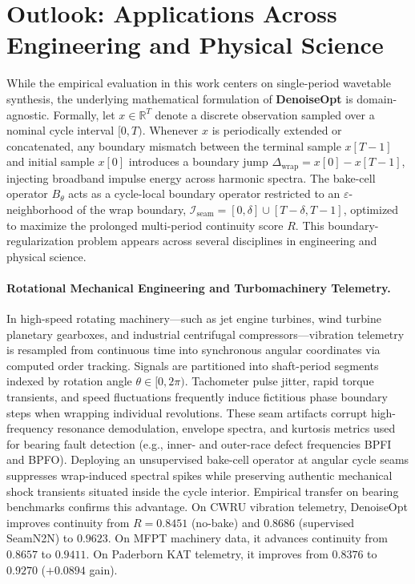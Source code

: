 \section{Outlook: Applications Across Engineering and Physical Science}
\label{sec:outlook}
\enlargethispage{30pt}

While the empirical evaluation in this work centers on single-period wavetable synthesis, the underlying mathematical formulation of \textbf{DenoiseOpt} is domain-agnostic.
Formally, let $x \in \mathbb{R}^T$ denote a discrete observation sampled over a nominal cycle interval $[0, T)$.
Whenever $x$ is periodically extended or concatenated, any boundary mismatch between the terminal sample $x[T-1]$ and initial sample $x[0]$ introduces a boundary jump $\Delta_{\text{wrap}} = x[0] - x[T-1]$, injecting broadband impulse energy across harmonic spectra.
The bake-cell operator $B_\theta$ acts as a cycle-local boundary operator restricted to an $\varepsilon$-neighborhood of the wrap boundary, $\mathcal{I}_{\text{seam}} = [0, \delta] \cup [T-\delta, T-1]$, optimized to maximize the prolonged multi-period continuity score $R$.
This boundary-regularization problem appears across several disciplines in engineering and physical science.

\paragraph{Rotational Mechanical Engineering and Turbomachinery Telemetry.}
In high-speed rotating machinery—such as jet engine turbines, wind turbine planetary gearboxes, and industrial centrifugal compressors—vibration telemetry is resampled from continuous time into synchronous angular coordinates via computed order tracking.
Signals are partitioned into shaft-period segments indexed by rotation angle $\theta \in [0, 2\pi)$.
Tachometer pulse jitter, rapid torque transients, and speed fluctuations frequently induce fictitious phase boundary steps when wrapping individual revolutions.
These seam artifacts corrupt high-frequency resonance demodulation, envelope spectra, and kurtosis metrics used for bearing fault detection (e.g., inner- and outer-race defect frequencies BPFI and BPFO).
Deploying an unsupervised bake-cell operator at angular cycle seams suppresses wrap-induced spectral spikes while preserving authentic mechanical shock transients situated inside the cycle interior.
Empirical transfer on bearing benchmarks confirms this advantage.
On CWRU vibration telemetry, DenoiseOpt improves continuity from $R = 0.8451$ (no-bake) and $0.8686$ (supervised SeamN2N) to $\mathbf{0.9623}$.
On MFPT machinery data, it advances continuity from $0.8657$ to $\mathbf{0.9411}$.
On Paderborn KAT telemetry, it improves from $0.8376$ to $\mathbf{0.9270}$ ($+0.0894$ gain).

